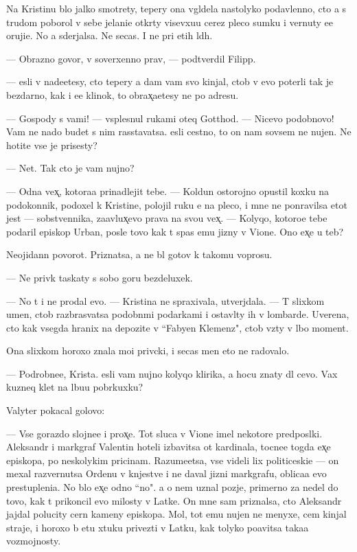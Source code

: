 \documentclass[10pt]{book}
\begin{document}
Na Kristinu b{\yi}lo jalko smotrety, tepery ona v{\yi}gl{\ia}dela nastolyko podavlenno{\y}, cto {\y}a s trudom poborol v sebe jelani{\y}e otkr{\yi}ty visevxu{\y}u cerez pleco sumku i vernuty {\y}e{\y}e oruji{\y}e. No {\y}a sderjalsa. Ne se{\y}cas. I ne pri etih l{\iu}d{\ia}h.

— Obrazno govor{\ia}, v{\yi} soverxenno prav{\yi}, — podtverdil Filipp.

— {\Y}esli v{\yi} nade{\y}etesy, cto tepery {\y}a dam vam svo{\y} kinjal, ctob{\yi} v{\yi} {\y}evo poter{\ia}li tak je bezdarno, kak i {\y}e{\y}e klinok, to obrax̨a{\y}etesy ne po adresu.

— Gospody s vami! — vsplesnul rukami oteq Gotthod. — Nicevo podobnovo! Vam ne nado budet s nim rasstavatsa. {\Y}esli cestno, to on nam sovsem ne nujen. Ne hotite vse je prisesty?

— Net. Tak cto je vam nujno?

— Odna vex̨, kotora{\y}a prinadlejit tebe. — Koldun ostorojno opustil koxku na podokonnik, podoxel k Kristine, polojil ruku {\y}e{\y} na pleco, i mne ne ponravilsa etot jest — sobstvennika, za{\y}avl{\ia}{\y}ux̨evo prava na svo{\y}u vex̨. — Kolyqo, kotoro{\y}e tebe podaril {\y}episkop Urban, posle tovo kak t{\yi} spas {\y}emu jizny v Vione. Ono {\y}ex̨e u teb{\ia}?

Neojidann{\yi}{\y} povorot. Priznatsa, {\y}a ne b{\yi}l gotov k takomu voprosu.

— Ne priv{\yi}k taskaty s sobo{\y} goru bezdeluxek.

— No t{\yi} i ne prodal {\y}evo. — Kristina ne spraxivala, utverjdala. — T{\yi} slixkom umen, ctob{\yi} razbras{\yi}vatsa podobn{\yi}mi podarkami i ostavl{\ia}ty ih v lombarde. Uverena, cto kak vsegda hranix na depozite v ``Fabyen Klemenz", ctob{\yi} vz{\ia}ty v l{\iu}bo{\y} moment.

Ona slixkom horoxo znala mo{\y}i priv{\yi}cki, i se{\y}cas men{\ia} eto ne radovalo.

— Podrobne{\y}e, Krista. {\Y}esli vam nujno kolyqo klirika, {\y}a hocu znaty dl{\ia} cevo. Vax kuzneq kl{\iu}{\y}et na l{\iu}bu{\y}u pobr{\ia}kuxku?

Valyter pokacal golovo{\y}:

— Vse gorazdo slojne{\y}e i prox̨e. Tot sluca{\y} v Vione imel nekotor{\yi}{\y}e predpos{\yi}lki. Aleksandr i markgraf Valentin hoteli izbavitsa ot kardinala, tocne{\y}e togda {\y}ex̨e {\y}episkopa, po neskolykim pricinam. Razume{\y}etsa, vse videli lix politiceski{\y}e — on mexal razvernutsa Ordenu v kn{\ia}jestve i ne daval jizni markgrafu, oblica{\y}a {\y}evo prestupleni{\y}a. No b{\yi}lo {\y}ex̨e odno ``no". {\Y}a o nem uznal pozje, primerno za nedel{\iu} do tovo, kak t{\yi} prikoncil {\y}evo milosty v Latke. On mne sam priznalsa, cto Aleksandr jajdal polucity cern{\yi}{\y} kameny {\y}episkopa. Mol, tot {\y}emu nujen ne menyxe, cem kinjal{\yi} straje{\y}, i horoxo b{\yi} etu xtuku privezti v Latku, kak tolyko po{\y}avitsa taka{\y}a vozmojnosty.
\end{document}
